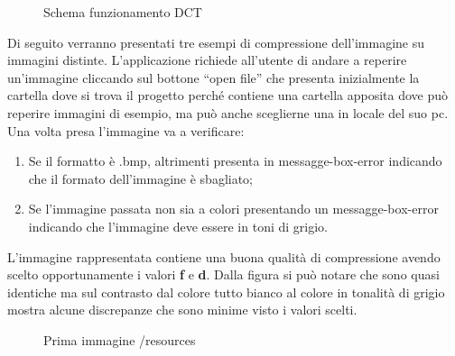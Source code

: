 \documentclass[12pt]{article}
\begin{document}
\begin{figure}[H]
    \caption{Schema funzionamento DCT}
\end{figure}

Di seguito verranno presentati tre esempi di compressione dell’immagine su immagini distinte.\newline
	L'applicazione richiede all’utente di andare a reperire un’immagine cliccando sul bottone “open file” che presenta inizialmente la cartella dove si trova il progetto perché contiene una cartella apposita  dove può reperire immagini di esempio, ma può anche sceglierne una in locale del suo pc.\newline
	Una volta presa l’immagine va a verificare:
	\begin{enumerate}
		\item Se il formatto è .bmp, altrimenti presenta in messagge-box-error indicando che il formato dell’immagine è sbagliato;
		\item Se l’immagine passata non sia a colori presentando un messagge-box-error indicando che l’immagine deve essere in toni di grigio.
	\end{enumerate}
L’immagine rappresentata contiene una buona qualità di compressione avendo scelto opportunamente i valori \textbf{f} e \textbf{d}. Dalla figura si può notare che sono quasi identiche ma sul contrasto dal colore tutto bianco al colore in tonalità di grigio mostra alcune discrepanze che sono minime visto i valori scelti.

\begin{figure}[H]
    \caption{Prima immagine /resources}
    \label{fig: Con f = 124 e d =138}
\end{figure}
\end{document}
